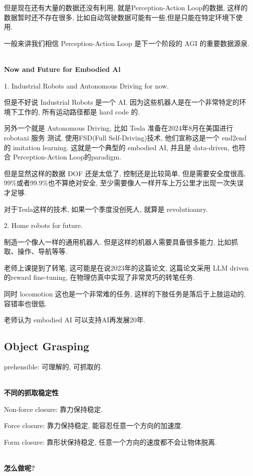 但是现在还有大量的数据还没有利用, 就是Perception-Action Loop的数据, 
这样的数据暂时还不存在很多, 比如自动驾驶数据可能有一些,但是只能在特定环境下使用.

一般来讲我们相信 Perception-Action Loop 是下一个阶段的 AGI 的重要数据源泉.

\textbf{\\Now and Future for Embodied Al}

1. Industrial Robots and Autonomous Driving for now.

但是不好说 Industrial Robots 是一个 AI. 因为这些机器人是在一个非常特定的环境下工作的, 
所有运动路径都是 hard code 的.

另外一个就是 Autonomous Driving, 比如 Tesla 准备在2024年8月在美国进行 robotaxi 服务
测试, 使用FSD(Full Self-Driving)技术, 他们宣称这是一个 end2end 的 imitation learning.
这就是一个典型的 embodied AI, 并且是 data-driven, 也符合 Perception-Action Loop的paradigm.

但是显然这样的数据 DOF 还是太低了, 控制还是比较简单, 但是需要安全度很高, 
99\%或者99.9\%也不算绝对安全,
至少需要像人一样开车上万公里才出现一次失误才足够.

对于Tesla这样的技术, 如果一个季度没创死人, 就算是 revolutioanry.

2. Home robots for future.

制造一个像人一样的通用机器人. 但是这样的机器人需要具备很多能力, 比如抓取、操作、导航等等.

老师上课提到了转笔, 这可能是在说2023年的这篇论文\cite{ma2023eureka}, 这篇论文采用
LLM driven的reward fine-tuning, 在物理仿真中实现了非常灵巧的转笔任务.

同时 locomotion 这也是一个非常难的任务, 这样的下肢任务是落后于上肢运动的, 容错率也很低.

老师认为 embodied AI 可以支持AI再发展20年.

\subsection{Object Grasping}

prehensible: 可理解的, 可抓取的.

\textbf{\\不同的抓取稳定性}

Non-force closure: 靠力保持稳定.

Force closure: 靠力保持稳定, 能容忍任意一个方向的加速度.

Form closure: 靠形状保持稳定, 任意一个方向的速度都不会让物体脱离.

\textbf{\\怎么做呢?}

